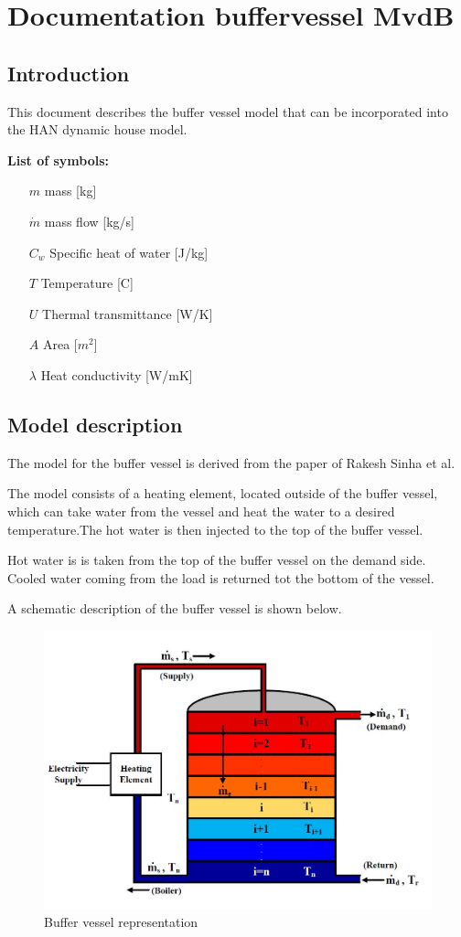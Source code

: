 \section{Documentation buffervessel MvdB}

\subsection{Introduction}

This document describes the buffer vessel model that can be incorporated into the HAN dynamic house model.

\textbf{List of symbols:}

\begin{itemize}
    \item [$m$] {mass [kg]}
    \item [$\dot{m}$] {mass flow [kg/s]}
    \item [$C_w$] {Specific heat of water [J/kg]}
    \item [$T$] {Temperature [C]}
    \item [$U$] {Thermal transmittance [W/K]}
    \item [$A$] {Area [\(m^2\)]}
    \item [$\lambda$] {Heat conductivity [W/mK]}
\end{itemize}

\subsection{Model description}

The model for the buffer vessel is derived from the paper of Rakesh Sinha et al. \cite{sinha2020flexibility}

The model consists of a heating element, located outside of the buffer vessel, which can take water from the vessel and heat the water to a desired temperature.The hot water is then injected to the top of the buffer vessel. 

Hot water is is taken from the top of the buffer vessel on the demand side. Cooled water coming from the load is returned tot the bottom of the vessel.

A schematic description of the buffer vessel is shown below.

\begin{figure}[H]
	\centering
	\includegraphics[width=0.8\columnwidth]{Pictures/buffervessel_setup.JPG}
	\caption[Short title]{Buffer vessel representation}
\end{figure}

